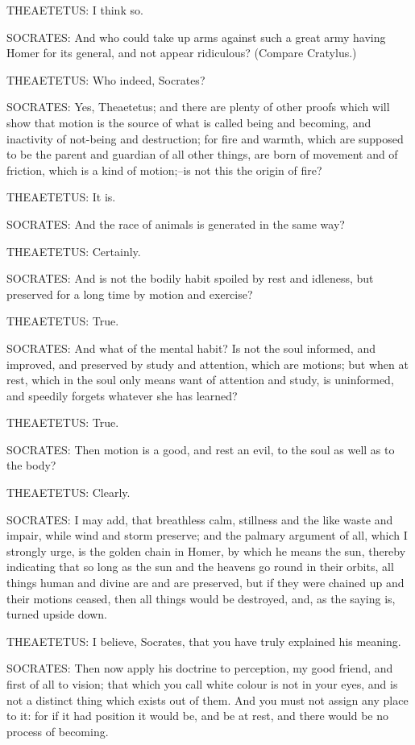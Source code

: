 THEAETETUS: I think so.

SOCRATES: And who could take up arms against such a great army having
Homer for its general, and not appear ridiculous? (Compare Cratylus.)

THEAETETUS: Who indeed, Socrates?

SOCRATES: Yes, Theaetetus; and there are plenty of other proofs
which will show that motion is the source of what is called being and
becoming, and inactivity of not-being and destruction; for fire and
warmth, which are supposed to be the parent and guardian of all other
things, are born of movement and of friction, which is a kind of
motion;--is not this the origin of fire?

THEAETETUS: It is.

SOCRATES: And the race of animals is generated in the same way?

THEAETETUS: Certainly.

SOCRATES: And is not the bodily habit spoiled by rest and idleness, but
preserved for a long time by motion and exercise?

THEAETETUS: True.

SOCRATES: And what of the mental habit? Is not the soul informed, and
improved, and preserved by study and attention, which are motions; but
when at rest, which in the soul only means want of attention and study,
is uninformed, and speedily forgets whatever she has learned?

THEAETETUS: True.

SOCRATES: Then motion is a good, and rest an evil, to the soul as well
as to the body?

THEAETETUS: Clearly.

SOCRATES: I may add, that breathless calm, stillness and the like waste
and impair, while wind and storm preserve; and the palmary argument of
all, which I strongly urge, is the golden chain in Homer, by which
he means the sun, thereby indicating that so long as the sun and the
heavens go round in their orbits, all things human and divine are and
are preserved, but if they were chained up and their motions ceased,
then all things would be destroyed, and, as the saying is, turned upside
down.

THEAETETUS: I believe, Socrates, that you have truly explained his
meaning.

SOCRATES: Then now apply his doctrine to perception, my good friend, and
first of all to vision; that which you call white colour is not in your
eyes, and is not a distinct thing which exists out of them. And you must
not assign any place to it: for if it had position it would be, and be
at rest, and there would be no process of becoming.

